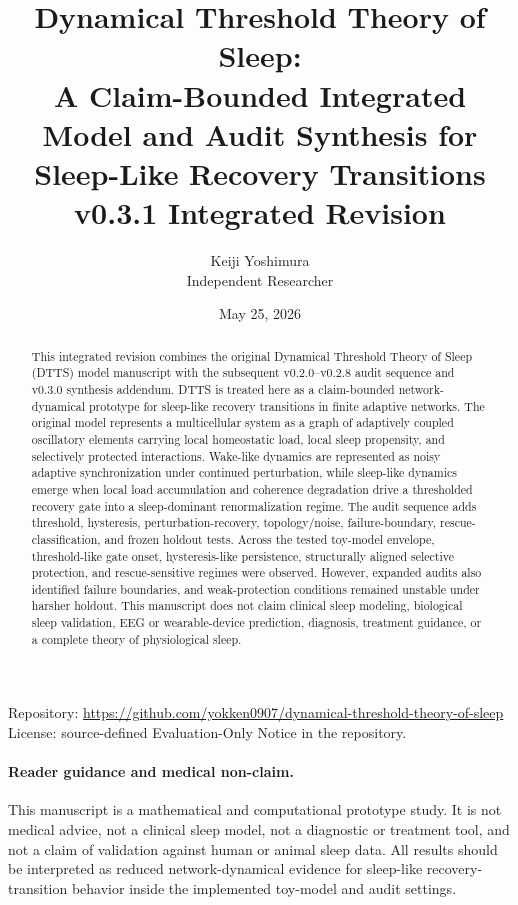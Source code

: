 \documentclass[11pt,a4paper]{article}
\title{Dynamical Threshold Theory of Sleep:\\
A Claim-Bounded Integrated Model and Audit Synthesis for Sleep-Like Recovery Transitions\\
\large v0.3.1 Integrated Revision}
\author{Keiji Yoshimura\\\small Independent Researcher}
\date{May 25, 2026}
\begin{document}
\maketitle

\begin{center}
\small
Repository: \url{https://github.com/yokken0907/dynamical-threshold-theory-of-sleep}\\
License: source-defined Evaluation-Only Notice in the repository.
\end{center}

\begin{abstract}
This integrated revision combines the original Dynamical Threshold Theory of Sleep (DTTS) model manuscript with the subsequent v0.2.0--v0.2.8 audit sequence and v0.3.0 synthesis addendum. DTTS is treated here as a claim-bounded network-dynamical prototype for sleep-like recovery transitions in finite adaptive networks. The original model represents a multicellular system as a graph of adaptively coupled oscillatory elements carrying local homeostatic load, local sleep propensity, and selectively protected interactions. Wake-like dynamics are represented as noisy adaptive synchronization under continued perturbation, while sleep-like dynamics emerge when local load accumulation and coherence degradation drive a thresholded recovery gate into a sleep-dominant renormalization regime. The audit sequence adds threshold, hysteresis, perturbation-recovery, topology/noise, failure-boundary, rescue-classification, and frozen holdout tests. Across the tested toy-model envelope, threshold-like gate onset, hysteresis-like persistence, structurally aligned selective protection, and rescue-sensitive regimes were observed. However, expanded audits also identified failure boundaries, and weak-protection conditions remained unstable under harsher holdout. This manuscript does not claim clinical sleep modeling, biological sleep validation, EEG or wearable-device prediction, diagnosis, treatment guidance, or a complete theory of physiological sleep.
\end{abstract}

\paragraph{Reader guidance and medical non-claim.}
This manuscript is a mathematical and computational prototype study. It is not medical advice, not a clinical sleep model, not a diagnostic or treatment tool, and not a claim of validation against human or animal sleep data. All results should be interpreted as reduced network-dynamical evidence for sleep-like recovery-transition behavior inside the implemented toy-model and audit settings.
\end{document}
